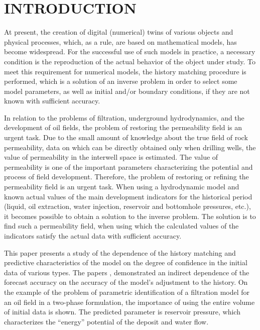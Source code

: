 \documentclass[
11pt,%
tightenlines,%
twoside,%
onecolumn,%
nofloats,%
nobibnotes,%
nofootinbib,%
superscriptaddress,%
noshowpacs,%
centertags]%
{revtex4}
\begin{document}
\maketitle




\section{INTRODUCTION}
	At present, the creation of digital (numerical) twins of various objects and physical processes, which, as a rule, are based on mathematical models, has become widespread. For the successful use of such models in practice, a necessary condition is the reproduction of the actual behavior of the object under study. To meet this requirement for numerical models, the history matching procedure is performed, which is a solution of an inverse problem in order to select some model parameters, as well as initial and/or boundary conditions, if they are not known with sufficient accuracy. 
	
	In relation to the problems of filtration, underground hydrodynamics, and the development of oil fields, the problem of restoring the permeability field is an urgent task. Due to the small amount of knowledge about the true field of rock permeability, data on which can be directly obtained only when drilling wells, the value of permeability in the interwell space is estimated. The value of permeability is one of the important parameters characterizing the potential and process of field development. Therefore, the problem of restoring or refining the permeability field is an urgent task. When using a hydrodynamic model and known actual values of the main development indicators for the historical period (liquid, oil extraction, water injection, reservoir and bottomhole pressures, etc.), it becomes possible to obtain a solution to the inverse problem. The solution is to find such a permeability field, when using which the calculated values of the indicators satisfy the actual data with sufficient accuracy.

	This paper presents a study of the dependence of the history matching and predictive characteristics of the model on the degree of confidence in the initial data of various types. The papers \cite{mus}, \cite{kos} demonstrated an indirect dependence of the forecast accuracy on the accuracy of the model's adjustment to the history. On the example of the problem of parametric identification of a filtration model for an oil field in a two-phase formulation, the importance of using the entire volume of initial data is shown. The predicted parameter is reservoir pressure, which characterizes the “energy” potential of the deposit and water flow.
\end{document}
